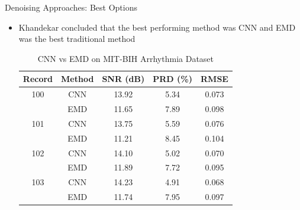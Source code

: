 \documentclass{beamer}
\begin{document}
\begin{frame}{Denoising Approaches: Best Options}
    \begin{itemize}
        \item Khandekar concluded that the best performing method was CNN \cite{residualcnn} and EMD \cite{LI2025109818} was the best traditional method \cite{Khandekar2025ECGDF} 
        \begin{table}[T]
            \caption{CNN vs EMD on MIT-BIH Arrhythmia Dataset \cite{moody2001mitdb}\cite{Khandekar2025ECGDF}}
            \label{tab:ecg_comparison}
            \begin{tabular}{c c c c c}
                \hline
                \textbf{Record} & \textbf{Method} & \textbf{SNR (dB)} & \textbf{PRD (\%)} & \textbf{RMSE} \\
                \hline
                100 & CNN & 13.92 & 5.34 & 0.073 \\
                    & EMD & 11.65 & 7.89 & 0.098 \\
                \hline
                101 & CNN & 13.75 & 5.59 & 0.076 \\
                    & EMD & 11.21 & 8.45 & 0.104 \\
                \hline
                102 & CNN & 14.10 & 5.02 & 0.070 \\
                    & EMD & 11.89 & 7.72 & 0.095 \\
                \hline
                103 & CNN & 14.23 & 4.91 & 0.068 \\
                    & EMD & 11.74 & 7.95 & 0.097 \\
                \hline
                \end{tabular}
            \end{table}
    \end{itemize}
\end{frame}
\end{document}
